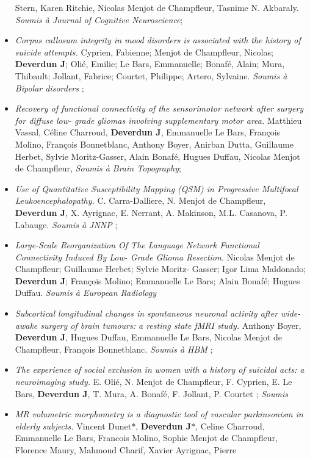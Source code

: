 \begin{itemize}
     Stern, Karen Ritchie, Nicolas Menjot de Champfleur, Tasnime N. Akbaraly. {\em Soumis à Journal of
     Cognitive Neuroscience};
\item {\em Corpus callosum integrity in mood disorders is associated with the history of suicide attempts.}
   Cyprien, Fabienne; Menjot de Champfleur, Nicolas; {\bf Deverdun J}; Olié, Emilie; Le Bars,
   Emmanuelle; Bonafé, Alain; Mura, Thibault; Jollant, Fabrice; Courtet, Philippe; Artero,
   Sylvaine. {\em Soumis à Bipolar disorders} ;
\item {\em Recovery of functional connectivity of the sensorimotor network after surgery for diffuse low-
   grade gliomas involving supplementary motor area.} Matthieu Vassal, Céline Charroud, {\bf Deverdun J}, Emmanuelle Le Bars, François Molino, François Bonnetblanc, Anthony Boyer,
      Anirban Dutta, Guillaume Herbet, Sylvie Moritz-Gasser, Alain Bonafé, Hugues Duffau, Nicolas
      Menjot de Champfleur, {\em Soumis à Brain Topography};
\item {\em Use of Quantitative Susceptibility Mapping (QSM) in Progressive Multifocal
   Leukoencephalopathy.} C. Carra-Dalliere, N. Menjot de Champfleur, {\bf Deverdun J}, X. Ayrignac,
  E. Nerrant, A. Makinson, M.L. Casanova, P. Labauge. {\em Soumis à JNNP} ;
\item {\em Large-Scale Reorganization Of The Language Network Functional Connectivity Induced By Low-
   Grade Glioma Resection.} Nicolas Menjot de Champfleur; Guillaume Herbet; Sylvie Moritz-
  Gasser; Igor Lima Maldonado; {\bf Deverdun J}; François Molino; Emmanuelle Le Bars; Alain
    Bonafé; Hugues Duffau. {\em Soumis à European Radiology}
\item {\em Subcortical longitudinal changes in spontaneous neuronal activity after wide-awake surgery of
   brain tumours: a resting state fMRI study.} Anthony Boyer, {\bf Deverdun J}, Hugues Duffau,
    Emmanuelle Le Bars, Nicolas Menjot de Champfleur, François Bonnetblanc. {\em Soumis à HBM} ;
\item {\em The experience of social exclusion in women with a history of suicidal acts: a neuroimaging
study.} E. Olié, N. Menjot de Champfleur, F. Cyprien, E. Le Bars, {\bf Deverdun J}, T. Mura, A. Bonafé,
 F. Jollant, P. Courtet ; {\em Soumis}
\item {\em MR volumetric morphometry is a diagnostic tool of vascular parkinsonism in elderly subjects.}
   Vincent Dunet$\ast$, {\bf Deverdun J}$\ast$, Celine Charroud, Emmanuelle Le Bars, Francois Molino,
  Sophie Menjot de Champfleur, Florence Maury, Mahmoud Charif, Xavier Ayrignac, Pierre

\end{itemize}
